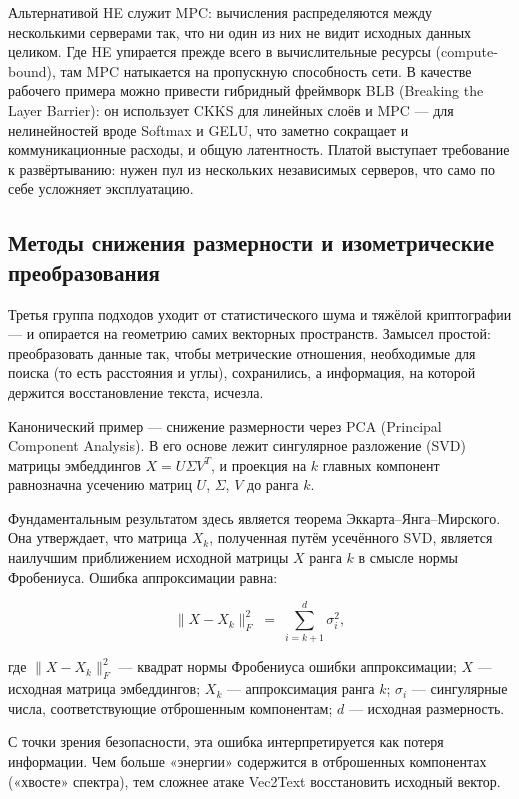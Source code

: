 \documentclass[a4paper, 12pt, oneside, openany]{article}
\begin{document}
Альтернативой HE служит MPC: вычисления распределяются между несколькими серверами так, что ни один из них не видит исходных данных целиком. Где HE упирается прежде всего в вычислительные ресурсы (compute-bound), там MPC натыкается на пропускную способность сети. В качестве рабочего примера можно привести гибридный фреймворк BLB (Breaking the Layer Barrier): он использует CKKS для линейных слоёв и MPC — для нелинейностей вроде Softmax и GELU, что заметно сокращает и коммуникационные расходы, и общую латентность. Платой выступает требование к развёртыванию: нужен пул из нескольких независимых серверов, что само по себе усложняет эксплуатацию.

\subsection{Методы снижения размерности и изометрические преобразования}

Третья группа подходов уходит от статистического шума и тяжёлой криптографии — и опирается на геометрию самих векторных пространств. Замысел простой: преобразовать данные так, чтобы метрические отношения, необходимые для поиска (то есть расстояния и углы), сохранились, а информация, на которой держится восстановление текста, исчезла.

Канонический пример — снижение размерности через PCA (Principal Component Analysis). В его основе лежит сингулярное разложение (SVD) матрицы эмбеддингов $X = U\Sigma V^{T}$, и проекция на $k$ главных компонент равнозначна усечению матриц $U$, $\Sigma$, $V$ до ранга $k$.

Фундаментальным результатом здесь является теорема Эккарта--Янга--Мирского. Она утверждает, что матрица $X_{k}$, полученная путём усечённого SVD, является наилучшим приближением исходной матрицы $X$ ранга $k$ в смысле нормы Фробениуса. Ошибка аппроксимации равна:

\[
\| X - X_{k} \|_{F}^{2} \;=\; \sum_{i = k + 1}^{d} \sigma_{i}^{2},
\]

где $\| X - X_{k} \|_{F}^{2}$ --- квадрат нормы Фробениуса ошибки аппроксимации; $X$ --- исходная матрица эмбеддингов; $X_{k}$ --- аппроксимация ранга $k$; $\sigma_{i}$ --- сингулярные числа, соответствующие отброшенным компонентам; $d$ --- исходная размерность.

С точки зрения безопасности, эта ошибка интерпретируется как потеря информации. Чем больше «энергии» содержится в отброшенных компонентах («хвосте» спектра), тем сложнее атаке Vec2Text восстановить исходный вектор.
\end{document}
